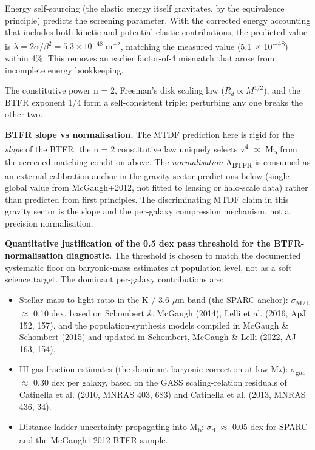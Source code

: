 \documentclass[11pt,a4paper]{article}
\begin{document}
Energy self-sourcing (the elastic energy itself gravitates, by the equivalence principle) predicts the screening parameter. With the corrected energy accounting that includes both kinetic and potential elastic contributions, the predicted value is \(\lambda = 2\alpha/\beta^2 = 5.3 \times 10^{-48}\;\mathrm{m}^{-2}\), matching the measured value (5.1 $\times$ 10\textsuperscript{$-$48}) within 4\%. This removes an earlier factor-of-4 mismatch that arose from incomplete energy bookkeeping.

The constitutive power n = 2, Freeman's disk scaling law (\(R_d \propto M^{1/2}\)), and the BTFR exponent 1/\allowbreak{}4 form a self-consistent triple: perturbing any one breaks the other two.

\textbf{BTFR slope vs normalisation.} The MTDF prediction here is rigid for the \emph{slope} of the BTFR: the n = 2 constitutive law uniquely selects v\textsuperscript{4} $\propto$ M\textsubscript{b} from the screened matching condition above. The \emph{normalisation} A\textsubscript{BTFR} is consumed as an external calibration anchor in the gravity-sector predictions below (single global value from McGaugh+2012, not fitted to lensing or halo-scale data) rather than predicted from first principles. The discriminating MTDF claim in this gravity sector is the slope and the per-galaxy compression mechanism, not a precision normalisation.

\textbf{Quantitative justification of the 0.5 dex pass threshold for the BTFR-normalisation diagnostic.} The threshold is chosen to match the documented systematic floor on baryonic-mass estimates at population level, not as a soft science target. The dominant per-galaxy contributions are:

\begin{itemize}
  \item Stellar mass-to-light ratio in the K / 3.6 $\mu$m band (the SPARC anchor): $\sigma$\textsubscript{M/\allowbreak{}L} $\approx$ 0.10 dex, based on Schombert \& McGaugh (2014), Lelli et al. (2016, ApJ 152, 157), and the population-synthesis models compiled in McGaugh \& Schombert (2015) and updated in Schombert, McGaugh \& Lelli (2022, AJ 163, 154).
  \item HI gas-fraction estimates (the dominant baryonic correction at low M\textsubscript{*}): $\sigma$\textsubscript{gas} $\approx$ 0.30 dex per galaxy, based on the GASS scaling-relation residuals of Catinella et al. (2010, MNRAS 403, 683) and Catinella et al. (2013, MNRAS 436, 34).
  \item Distance-ladder uncertainty propagating into M\textsubscript{b}: $\sigma$\textsubscript{d} $\approx$ 0.05 dex for SPARC and the McGaugh+2012 BTFR sample.
\end{itemize}
\end{document}
